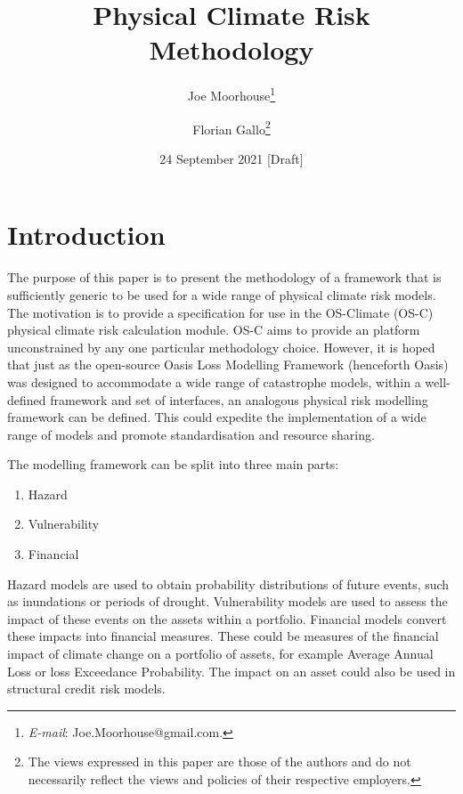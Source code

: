 \documentclass[a4paper,11pt]{extarticle} %
\title{Physical Climate Risk Methodology}
\author{Joe Moorhouse\thanks{\textit{E-mail}: Joe.Moorhouse@gmail.com.}
        \and
        Florian Gallo\thanks{
        \smallskip
        \newline%
    The views expressed in this paper are those of the authors and do not necessarily reflect the views and policies of their respective employers.}
    }
\date{24 September 2021 [Draft]}
\begin{document}

\maketitle{}



\clearpage
\setcounter{tocdepth}{4}
\renewcommand{\contentsname}{Contents}
\tableofcontents




\clearpage
\section{Introduction}
\label{Sec:Introduction}

The purpose of this paper is to present the methodology of a framework that is sufficiently generic to be used for a wide range of physical climate risk models. The motivation is to provide a specification for use in the OS-Climate (OS-C) \cite{OSC} physical climate risk calculation module. OS-C aims to provide an platform unconstrained by any one particular methodology choice. However, it is hoped that just as the open-source Oasis Loss Modelling Framework \cite{OasisLMF} (henceforth Oasis) was designed to accommodate a wide range of catastrophe models, within a well-defined framework and set of interfaces, an analogous physical risk modelling framework can be defined. This could expedite the implementation of a wide range of models and promote standardisation and resource sharing.

The modelling framework can be split into three main parts:

\begin{enumerate}
    \item Hazard
    \item Vulnerability
    \item Financial
\end{enumerate}

Hazard models are used to obtain probability distributions of future events, such as inundations or periods of drought. Vulnerability models are used to assess the impact of these events on the assets within a portfolio. Financial models convert these impacts into financial measures. These could be measures of the financial impact of climate change on a portfolio of assets, for example Average Annual Loss or loss Exceedance Probability. The impact on an asset could also be used in structural credit risk models.
\end{document}
